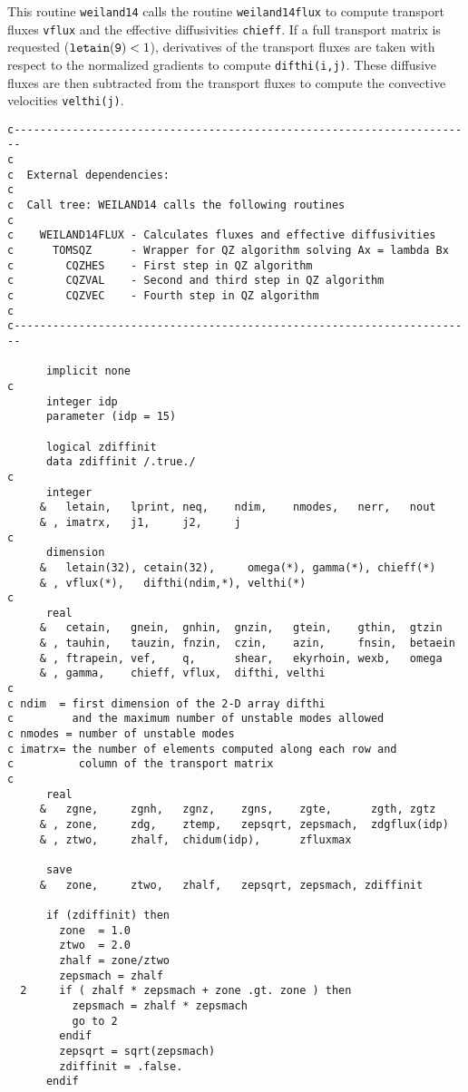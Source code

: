 This routine {\tt weiland14} calls the routine {\tt weiland14flux}
to compute transport fluxes {\tt vflux} and the effective diffusivities
{\tt chieff}.
If a full transport matrix is requested ($ {\tt letain(9)} < 1 $),
derivatives of the transport fluxes are taken with respect to the
normalized gradients to compute {\tt difthi(i,j)}.
These diffusive fluxes are then subtracted from the transport fluxes
to compute the convective velocities {\tt velthi(j)}.

\begin{verbatim}
c-----------------------------------------------------------------------
c
c  External dependencies:
c
c  Call tree: WEILAND14 calls the following routines
c
c    WEILAND14FLUX - Calculates fluxes and effective diffusivities
c      TOMSQZ      - Wrapper for QZ algorithm solving Ax = lambda Bx
c        CQZHES    - First step in QZ algorithm 
c        CQZVAL    - Second and third step in QZ algorithm
c        CQZVEC    - Fourth step in QZ algorithm
c
c-----------------------------------------------------------------------

      implicit none
c
      integer idp
      parameter (idp = 15)

      logical zdiffinit
      data zdiffinit /.true./
c
      integer 
     &   letain,   lprint, neq,    ndim,    nmodes,   nerr,   nout
     & , imatrx,   j1,     j2,     j
c
      dimension 
     &   letain(32), cetain(32),     omega(*), gamma(*), chieff(*) 
     & , vflux(*),   difthi(ndim,*), velthi(*)
c
      real 
     &   cetain,   gnein,  gnhin,  gnzin,   gtein,    gthin,  gtzin
     & , tauhin,   tauzin, fnzin,  czin,    azin,     fnsin,  betaein
     & , ftrapein, vef,    q,      shear,   ekyrhoin, wexb,   omega
     & , gamma,    chieff, vflux,  difthi, velthi
c
c ndim  = first dimension of the 2-D array difthi
c         and the maximum number of unstable modes allowed
c nmodes = number of unstable modes
c imatrx= the number of elements computed along each row and
c          column of the transport matrix
c
      real  
     &   zgne,     zgnh,   zgnz,    zgns,    zgte,      zgth, zgtz
     & , zone,     zdg,    ztemp,   zepsqrt, zepsmach,  zdgflux(idp)
     & , ztwo,     zhalf,  chidum(idp),      zfluxmax

      save 
     &   zone,     ztwo,   zhalf,   zepsqrt, zepsmach, zdiffinit

      if (zdiffinit) then 
        zone  = 1.0
        ztwo  = 2.0
        zhalf = zone/ztwo
        zepsmach = zhalf
  2     if ( zhalf * zepsmach + zone .gt. zone ) then
          zepsmach = zhalf * zepsmach
          go to 2
        endif
        zepsqrt = sqrt(zepsmach)
        zdiffinit = .false.
      endif


\end{verbatim}

